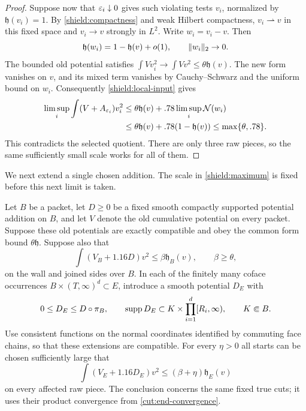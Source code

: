 \begin{proof}
Suppose now that $\varepsilon_i\downarrow0$ gives such violating tests $v_i$,
normalized by $\mathfrak h(v_i)=1$.  By \cref{shield:compactness} and
weak Hilbert compactness, $v_i\rightharpoonup v$ in this fixed space and
$v_i\to v$ strongly in $L^2$.  Write $w_i=v_i-v$.  Then
\[
 \mathfrak h(w_i)=1-\mathfrak h(v)+o(1),\qquad \lVert w_i\rVert_2\to0.
\]
The bounded old potential satisfies
$\int Vv_i^2\to\int Vv^2\le\theta\mathfrak h(v)$.  The new form
vanishes on $v$, and its mixed term vanishes by Cauchy--Schwarz and the
uniform bound on $w_i$.  Consequently \cref{shield:local-input} gives
\begin{align*}
 \limsup_i\int(V+A_{\varepsilon_i})v_i^2
 &\le\theta\mathfrak h(v)+.78\limsup_i\mathcal N(w_i)\\
 &\le\theta\mathfrak h(v)+.78(1-\mathfrak h(v))
 \le\max\{\theta,.78\}.
\end{align*}
This contradicts the selected quotient.  There are only three raw
pieces, so the same sufficiently small scale works for all of them.
\end{proof}

We next extend a single chosen addition.  The scale in
\cref{shield:maximum} is fixed before this next limit is taken.

\begin{lemma}\label{shield:extension}
Let $B$ be a packet, let $D\ge0$ be a fixed smooth compactly supported
potential addition on $B$, and let $V$ denote the old cumulative
potential on every packet.  Suppose these old potentials are exactly
compatible and obey the common form bound $\theta\mathfrak h$.
Suppose also that
\[
 \int(V_B+1.16D)v^2\le\beta\mathfrak h_B(v),\qquad \beta\ge\theta,
\]
on the wall and joined sides over $B$.  In each of the finitely many
coface occurrences $B\times(T,\infty)^d\subset E$, introduce a smooth
potential $D_E$ with
\begin{equation}\label{shield:extension-support}
 0\le D_E\le D\circ\pi_B,\qquad
 \operatorname{supp} D_E\subset K\times\prod_{i=1}^d[R_i,\infty),
 \qquad K\Subset B.
\end{equation}
Use consistent functions on the normal coordinates identified by
commuting face chains, so that these extensions are compatible.
For every $\eta>0$ all starts can be chosen sufficiently large that
\begin{equation}\label{shield:extended-bound}
 \int(V_E+1.16D_E)v^2\le(\beta+\eta)\mathfrak h_E(v)
\end{equation}
on every affected raw piece.  The conclusion concerns the same fixed
true cuts; it uses their product convergence from
\cref{cut:end-convergence}.
\end{lemma}

